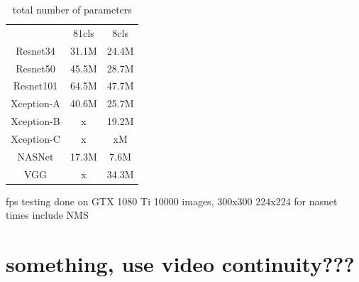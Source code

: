 \begin{table}
    \begin{tabular}{c|c|c}
                    & 81cls     & 8cls  \\
    Resnet34        & 31.1M     & 24.4M \\
    Resnet50        & 45.5M     & 28.7M \\
    Resnet101       & 64.5M     & 47.7M \\
    Xception-A      & 40.6M     & 25.7M \\
    Xception-B      & x         & 19.2M \\
    Xception-C      & x         & xM    \\
    NASNet          & 17.3M     & 7.6M  \\
    VGG             & x         & 34.3M \\
    \end{tabular}
    \caption{total number of parameters}
    \label{tab:parameters}
\end{table}

fps
testing done on GTX 1080 Ti
10000 images, 300x300 
224x224 for nasnet
times include NMS


\section{something, use video continuity???}


